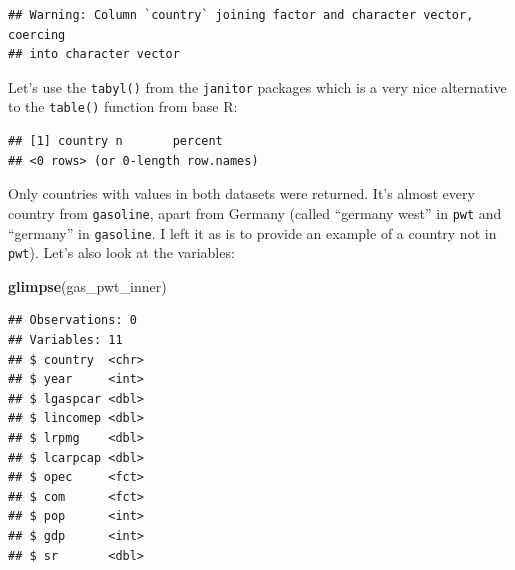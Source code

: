 \documentclass[]{gitbook}
\newenvironment{Shaded}{\begin{snugshade}}{\end{snugshade}}
\newcommand{\DataTypeTok}[1]{\textcolor[rgb]{0.13,0.29,0.53}{#1}}
\newcommand{\KeywordTok}[1]{\textcolor[rgb]{0.13,0.29,0.53}{\textbf{#1}}}
\newcommand{\NormalTok}[1]{#1}
\newcommand{\OperatorTok}[1]{\textcolor[rgb]{0.81,0.36,0.00}{\textbf{#1}}}
\newcommand{\StringTok}[1]{\textcolor[rgb]{0.31,0.60,0.02}{#1}}
\theoremstyle{definition}
\theoremstyle{definition}
\theoremstyle{definition}
\theoremstyle{remark}
\begin{document}
\begin{Shaded}
\end{Shaded}

\begin{verbatim}
## Warning: Column `country` joining factor and character vector, coercing
## into character vector
\end{verbatim}

Let's use the \texttt{tabyl()} from the \texttt{janitor} packages which
is a very nice alternative to the \texttt{table()} function from base R:

\begin{Shaded}
\end{Shaded}

\begin{verbatim}
## [1] country n       percent
## <0 rows> (or 0-length row.names)
\end{verbatim}

Only countries with values in both datasets were returned. It's almost
every country from \texttt{gasoline}, apart from Germany (called
``germany west'' in \texttt{pwt} and ``germany'' in \texttt{gasoline}. I
left it as is to provide an example of a country not in \texttt{pwt}).
Let's also look at the variables:

\begin{Shaded}
\begin{Highlighting}[]
\KeywordTok{glimpse}\NormalTok{(gas_pwt_inner)}
\end{Highlighting}
\end{Shaded}

\begin{verbatim}
## Observations: 0
## Variables: 11
## $ country  <chr> 
## $ year     <int> 
## $ lgaspcar <dbl> 
## $ lincomep <dbl> 
## $ lrpmg    <dbl> 
## $ lcarpcap <dbl> 
## $ opec     <fct> 
## $ com      <fct> 
## $ pop      <int> 
## $ gdp      <int> 
## $ sr       <dbl>
\end{verbatim}
\end{document}
